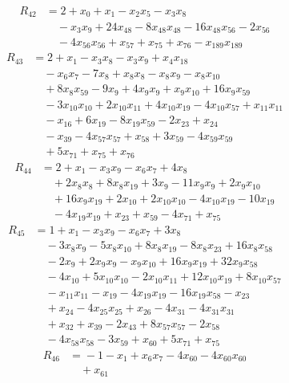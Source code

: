 \begin{align*}
R_{42}&={}2 +x_{0} +x_{1} -x_{2}x_{5} -x_{3}x_{8}\\
&\quad{}-x_{3}x_{9} +24x_{48} -8x_{48}x_{48} -16x_{48}x_{56} -2x_{56}\\
&\quad{}-4x_{56}x_{56} +x_{57} +x_{75} +x_{76} -x_{189}x_{189}
\end{align*}
\begin{align*}
R_{43}&={}2 +x_{1} -x_{3}x_{8} -x_{3}x_{9} +x_{4}x_{18}\\
&\quad{}-x_{6}x_{7} -7x_{8} +x_{8}x_{8} -x_{8}x_{9} -x_{8}x_{10}\\
&\quad{}+8x_{8}x_{59} -9x_{9} +4x_{9}x_{9} +x_{9}x_{10} +16x_{9}x_{59}\\
&\quad{}-3x_{10}x_{10} +2x_{10}x_{11} +4x_{10}x_{19} -4x_{10}x_{57} +x_{11}x_{11}\\
&\quad{}-x_{16} +6x_{19} -8x_{19}x_{59} -2x_{23} +x_{24}\\
&\quad{}-x_{39} -4x_{57}x_{57} +x_{58} +3x_{59} -4x_{59}x_{59}\\
&\quad{}+5x_{71} +x_{75} +x_{76}
\end{align*}
\begin{align*}
R_{44}&={}2 +x_{1} -x_{3}x_{9} -x_{6}x_{7} +4x_{8}\\
&\quad{}+2x_{8}x_{8} +8x_{8}x_{19} +3x_{9} -11x_{9}x_{9} +2x_{9}x_{10}\\
&\quad{}+16x_{9}x_{19} +2x_{10} +2x_{10}x_{10} -4x_{10}x_{19} -10x_{19}\\
&\quad{}-4x_{19}x_{19} +x_{23} +x_{59} -4x_{71} +x_{75}
\end{align*}
\begin{align*}
R_{45}&={}1 +x_{1} -x_{3}x_{9} -x_{6}x_{7} +3x_{8}\\
&\quad{}-3x_{8}x_{9} -5x_{8}x_{10} +8x_{8}x_{19} -8x_{8}x_{23} +16x_{8}x_{58}\\
&\quad{}-2x_{9} +2x_{9}x_{9} -x_{9}x_{10} +16x_{9}x_{19} +32x_{9}x_{58}\\
&\quad{}-4x_{10} +5x_{10}x_{10} -2x_{10}x_{11} +12x_{10}x_{19} +8x_{10}x_{57}\\
&\quad{}-x_{11}x_{11} -x_{19} -4x_{19}x_{19} -16x_{19}x_{58} -x_{23}\\
&\quad{}+x_{24} -4x_{25}x_{25} +x_{26} -4x_{31} -4x_{31}x_{31}\\
&\quad{}+x_{32} +x_{39} -2x_{43} +8x_{57}x_{57} -2x_{58}\\
&\quad{}-4x_{58}x_{58} -3x_{59} +x_{60} +5x_{71} +x_{75}
\end{align*}
\begin{align*}
R_{46}&={}-1 -x_{1} +x_{6}x_{7} -4x_{60} -4x_{60}x_{60}\\
&\quad{}+x_{61}
\end{align*}
